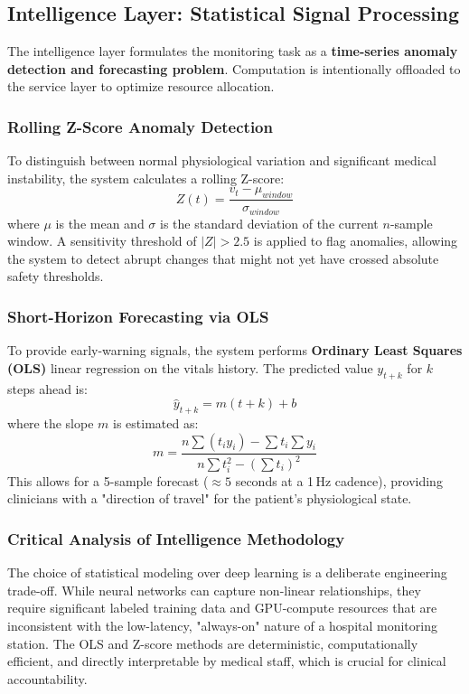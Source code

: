 \subsection{Intelligence Layer: Statistical Signal Processing}
The intelligence layer formulates the monitoring task as a \textbf{time-series anomaly detection and forecasting problem}. Computation is intentionally offloaded to the service layer to optimize resource allocation.

\subsubsection{Rolling Z-Score Anomaly Detection}
To distinguish between normal physiological variation and significant medical instability, the system calculates a rolling Z-score:
\begin{equation}
    Z(t) = \frac{v_t - \mu_{window}}{\sigma_{window}}
    \label{eq:z_score}
\end{equation}
where $\mu$ is the mean and $\sigma$ is the standard deviation of the current $n$-sample window. A sensitivity threshold of $|Z| > 2.5$ is applied to flag anomalies, allowing the system to detect abrupt changes that might not yet have crossed absolute safety thresholds.

\subsubsection{Short-Horizon Forecasting via OLS}
To provide early-warning signals, the system performs \textbf{Ordinary Least Squares (OLS)} linear regression on the vitals history. The predicted value $y_{t+k}$ for $k$ steps ahead is:
\begin{equation}
    \hat{y}_{t+k} = m(t+k) + b
    \label{eq:ols_prediction}
\end{equation}
where the slope $m$ is estimated as:
\begin{equation}
    m = \frac{n\sum(t_i y_i) - \sum t_i \sum y_i}{n\sum t_i^2 - (\sum t_i)^2}
    \label{eq:ols_math}
\end{equation}
This allows for a 5-sample forecast ($\approx 5$ seconds at a 1\,Hz cadence), providing clinicians with a "direction of travel" for the patient's physiological state.

\subsubsection{Critical Analysis of Intelligence Methodology}
The choice of statistical modeling over deep learning is a deliberate engineering trade-off. While neural networks can capture non-linear relationships, they require significant labeled training data and GPU-compute resources that are inconsistent with the low-latency, "always-on" nature of a hospital monitoring station. The OLS and Z-score methods are deterministic, computationally efficient, and directly interpretable by medical staff, which is crucial for clinical accountability.

